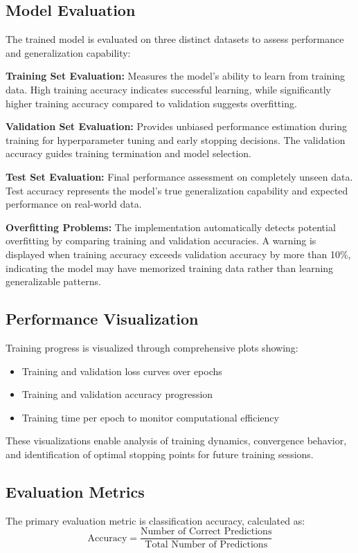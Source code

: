 \documentclass[conference]{IEEEtran}
\begin{document}
\subsection{Model Evaluation}
The trained model is evaluated on three distinct datasets to assess performance and generalization capability:

\textbf{Training Set Evaluation:} Measures the model's ability to learn from training data. High training accuracy indicates successful learning, while significantly higher training accuracy compared to validation suggests overfitting.

\textbf{Validation Set Evaluation:} Provides unbiased performance estimation during training for hyperparameter tuning and early stopping decisions. The validation accuracy guides training termination and model selection.

\textbf{Test Set Evaluation:} Final performance assessment on completely unseen data. Test accuracy represents the model's true generalization capability and expected performance on real-world data.

\textbf{Overfitting Problems:} The implementation automatically detects potential overfitting by comparing training and validation accuracies. A warning is displayed when training accuracy exceeds validation accuracy by more than 10\%, indicating the model may have memorized training data rather than learning generalizable patterns.

\subsection{Performance Visualization}
Training progress is visualized through comprehensive plots showing:
\begin{itemize}
\item Training and validation loss curves over epochs
\item Training and validation accuracy progression
\item Training time per epoch to monitor computational efficiency
\end{itemize}

These visualizations enable analysis of training dynamics, convergence behavior, and identification of optimal stopping points for future training sessions.

\subsection{Evaluation Metrics}
The primary evaluation metric is classification accuracy, calculated as:
\begin{equation}
\text{Accuracy} = \frac{\text{Number of Correct Predictions}}{\text{Total Number of Predictions}}
\end{equation}
\end{document}
